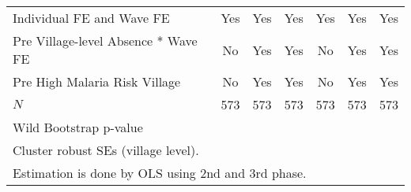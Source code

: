 {\begin{tabular}{l*{6}{c}}
Individual FE and Wave FE &         Yes         &         Yes         &         Yes         &         Yes         &         Yes         &         Yes         \\
Pre Village-level Absence * Wave FE&          No         &         Yes         &         Yes         &          No         &         Yes         &         Yes         \\
Pre High Malaria Risk Village &          No         &         Yes         &         Yes         &          No         &         Yes         &         Yes         \\
\hline
\(N\)       &         573         &         573         &         573         &         573         &         573         &         573         \\
Wild Bootstrap p-value &                     &                     &                     &                     &                     &                     \\
\hline\hline
\multicolumn{7}{l}{\footnotesize Cluster robust SEs (village level).}\\
\multicolumn{7}{l}{\footnotesize Estimation is done by OLS using 2nd and 3rd phase.}\\
\end{tabular}
}
